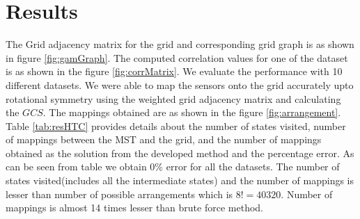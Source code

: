 \section{Results}
The Grid adjacency matrix for the grid and corresponding grid graph is as shown in figure \ref{fig:gamGraph}. The computed correlation values for one of the dataset  is as shown in the figure \ref{fig:corrMatrix}.
We evaluate the performance with 10 different datasets. We were able to map the sensors onto the grid accurately upto rotational symmetry using the weighted grid adjacency matrix and calculating the $GCS$. The mappings obtained are as shown in the figure \ref{fig:arrangement}.
Table \ref{tab:resHTC} provides details about the number of states visited, number of mappings between the MST and the grid, and the number of mappings obtained as the solution from the developed method and the percentage error. As can be seen from table we obtain 0\% error for all the datasets. 
The number of states visited(includes all the intermediate states) and the number of mappings is lesser than number of possible arrangements which is $8! = 40320$. Number of mappings is almost 14 times lesser than brute force method.

